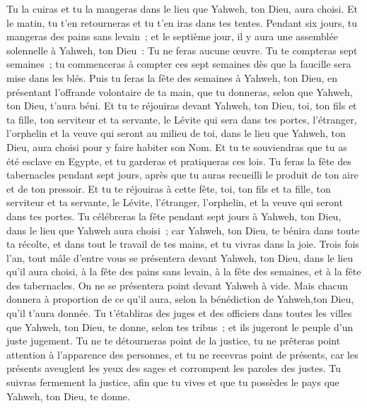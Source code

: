 \begin{multicols}{2}
Tu la cuiras et tu la mangeras dans le lieu que Yahweh, ton Dieu, aura choisi. Et le matin, tu t'en retourneras et tu t'en iras dans tes tentes.
Pendant six jours, tu mangeras des pains sans levain~; et le septième jour, il y aura une assemblée solennelle à Yahweh, ton Dieu~: Tu ne feras aucune œuvre.
Tu te compteras sept semaines~; tu commenceras à compter ces sept semaines dès que la faucille sera mise dans les blés.
Puis tu feras la fête des semaines à Yahweh, ton Dieu, en présentant l'offrande volontaire de ta main, que tu donneras, selon que Yahweh, ton Dieu, t'aura béni.
Et tu te réjouiras devant Yahweh, ton Dieu, toi, ton fils et ta fille, ton serviteur et ta servante, le Lévite qui sera dans tes portes, l'étranger, l'orphelin et la veuve qui seront au milieu de toi, dans le lieu que Yahweh, ton Dieu, aura choisi pour y faire habiter son Nom.
Et tu te souviendras que tu as été esclave en Egypte, et tu garderas et pratiqueras ces lois.
Tu feras la fête des tabernacles pendant sept jours, après que tu auras recueilli le produit de ton aire et de ton pressoir.
Et tu te réjouiras à cette fête, toi, ton fils et ta fille, ton serviteur et ta servante, le Lévite, l'étranger, l'orphelin, et la veuve qui seront dans tes portes.
Tu célébreras la fête pendant sept jours à Yahweh, ton Dieu, dans le lieu que Yahweh aura choisi~; car Yahweh, ton Dieu, te bénira dans toute ta récolte, et dans tout le travail de tes mains, et tu vivras dans la joie.
Trois fois l'an, tout mâle d'entre vous se présentera devant Yahweh, ton Dieu, dans le lieu qu'il aura choisi, à la fête des pains sans levain, à la fête des semaines, et à la fête des tabernacles. On ne se présentera point devant Yahweh à vide.
Mais chacun donnera à proportion de ce qu'il aura, selon la bénédiction de Yahweh,ton Dieu, qu'il t'aura donnée. 
Tu t'établiras des juges et des officiers dans toutes les villes que Yahweh, ton Dieu, te donne, selon tes tribus~; et ils jugeront le peuple d'un juste jugement.
Tu ne te détourneras point de la justice, tu ne prêteras point attention à l'apparence des personnes, et tu ne recevras point de présents, car les présents aveuglent les yeux des sages et corrompent les paroles des justes.
Tu suivras fermement la justice, afin que tu vives et que tu possèdes le pays que Yahweh, ton Dieu, te donne.

\end{multicols}
